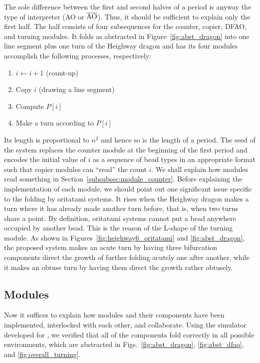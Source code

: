 The sole difference between the first and second halves of a period is anyway the type of interpreter (AO or $\overline{\rm AO}$). 
Thus, it should be sufficient to explain only the first half. 
The half consists of four subsequences for the counter, copier, DFAO, and turning modules. 
It folds as abstracted in Figure~\ref{fig:abst_dragon} into one line segment plus one turn of the Heighway dragon and has its four modules accomplish the following processes, respectively: 
\begin{enumerate}[itemsep=0pt]
\item $i \gets i + 1$ (count-up)
\item Copy $i$ (drawing a line segment)
\item Compute $P[i]$
\item Make a turn according to $P[i]$
\end{enumerate}
Its length is proportional to $n^2$ and hence so is the length of a period. 
The seed of the system replaces the counter module at the beginning of the first period and encodes the initial value of $i$ as a sequence of bead types in an appropriate format such that copier modules can ``read'' the count $i$. 
We shall explain how modules read something in Section~\ref{subsubsec:module_counter}. 
Before explaining the implementation of each module, we should point out one significant issue specific to the folding by oritatami systems. 
It rises when the Heighway dragon makes a turn where it has already made another turn before, that is, when two turns share a point. 
By definition, oritatami systems cannot put a bead anywhere occupied by another bead. 
This is the reason of the L-shape of the turning module. 
As shown in Figures~\ref{fig:heighway6_oritatami} and \ref{fig:abst_dragon}, the proposed system makes an acute turn by having three bifurcation components direct the growth of further folding acutely one after another, while it makes an obtuse turn by having them direct the growth rather obtusely. 

		\subsection{Modules}

Now it suffices to explain how modules and their components have been implemented, interlocked with each other, and collaborate. 
Using the simulator developed for \cite{HaKiOtSe2016}, we verified that all of the components fold correctly in all possible environments, which are abstracted in Figs.~\ref{fig:abst_dragon}, \ref{fig:abst_dfao}, and \ref{fig:overall_turning}. 

